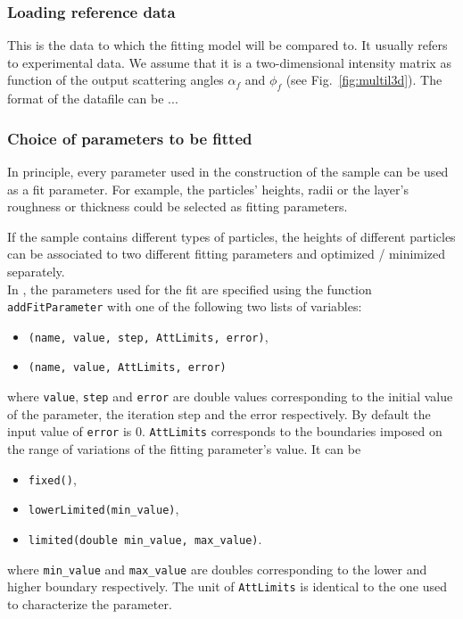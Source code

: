 \subsubsection{Loading reference data}
This is the data to which the fitting model will
be compared to. It usually refers to experimental data. We assume that it is a
two-dimensional intensity matrix as function of the output scattering
angles $\alpha_f$ and $\phi_f$ (see Fig.~\ref{fig:multil3d}). The format of the datafile can be ...

\subsubsection{Choice of parameters to be fitted}
In principle, every parameter used in the construction of the sample
can be used as a fit parameter. For example, the particles'
heights, radii or the layer's roughness or thickness could be selected
as fitting parameters. 


If the sample contains different types of particles, the heights of different particles can be associated to two different
fitting parameters and optimized / minimized separately.\\


In \BornAgain, the parameters used for the fit are specified using the
function \texttt{addFitParameter} with one of the following two lists
of variables:
\begin{itemize}
\item \texttt{(name, value, step, AttLimits, error)},
\item \texttt{(name, value, AttLimits, error)}
\end{itemize}
where \texttt{value}, \texttt{step} and \texttt{error} are double
values corresponding to the initial value of the parameter, the
iteration step and the error respectively. By default the input value
of \texttt{error} is 0. \texttt{AttLimits} corresponds to
the boundaries imposed on the range of variations of the fitting
parameter's value. It can be
\begin{itemize}
\item \texttt{fixed()}, 
\item \texttt{lowerLimited(min\_value)}, 
\item \texttt{limited(double min\_value, max\_value)}.
\end{itemize}
where \texttt{min\_value} and \texttt{max\_value} are
doubles corresponding to the lower and higher boundary respectively.
The unit of \texttt{AttLimits} is identical to the one used to characterize the
parameter.\\

